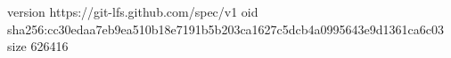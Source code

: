 version https://git-lfs.github.com/spec/v1
oid sha256:cc30edaa7eb9ea510b18e7191b5b203ca1627c5dcb4a0995643e9d1361ca6c03
size 626416
